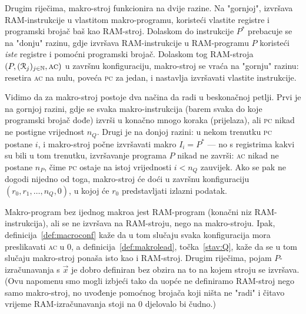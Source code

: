 Drugim riječima, makro-stroj funkcionira na dvije razine. Na "gornjoj", izvršava RAM-instrukcije u vlastitom makro-programu, koristeći vlastite registre i programski brojač baš kao RAM-stroj. Dolaskom do instrukcije $P^*$ prebacuje se na "donju" razinu, gdje izvršava RAM-instrukcije u RAM-programu $P$ koristeći \emph{iste} registre i pomoćni programski brojač. Dolaskom tog RAM-stroja $(P,(\mathcal R_{j})_{j\in{\mathbb N}},\textsc{ac})$ u završnu konfiguraciju, makro-stroj se vraća na "gornju" razinu: resetira \textsc{ac} na nulu, poveća \textsc{pc} za jedan, i nastavlja izvršavati vlastite instrukcije.

Vidimo da za makro-stroj postoje dva načina da radi u beskonačnoj petlji. Prvi je na gornjoj razini, gdje se svaka makro-instrukcija (barem svaka do koje programski brojač dođe) izvrši u konačno mnogo koraka (prijelaza), ali \textsc{pc} nikad ne postigne vrijednost $n_Q$. Drugi je na donjoj razini: u nekom trenutku \textsc{pc} postane $i$, i makro-stroj počne izvršavati makro $I_i=P^*$ --- no s registrima kakvi su bili u tom trenutku, izvršavanje programa $P$ nikad ne završi: \textsc{ac} nikad ne postane $n_P$, čime \textsc{pc} ostaje na istoj vrijednosti $i<n_Q$ zauvijek. Ako se pak ne dogodi nijedno od toga, makro-stroj će doći u završnu konfiguraciju $(r_0,r_1,\dotsc,n_Q,0)$, u kojoj će $r_0$ predstavljati izlazni podatak.

\begin{napomena}[{name=[svaki RAM-program je makro-program]}]\label{nap:rem}
Makro-program bez ijednog makroa jest RAM-program (konačni niz RAM-instrukcija), ali se ne izvršava na RAM-stroju, nego na makro-stroju. Ipak, definicija~\ref{def:macroconf} kaže da u tom slučaju svaka konfiguracija mora preslikavati \textsc{ac} u $0$, a definicija~\ref{def:makrolead}, točka~\ref{stav:Q}, kaže da se u tom slučaju makro-stroj ponaša isto kao i RAM-stroj. Drugim riječima, pojam $P$-izračunavanja s $\vec x$ je dobro definiran bez obzira na to na kojem stroju se izvršava. (Ovu napomenu smo mogli izbjeći tako da uopće ne definiramo RAM-stroj nego samo makro-stroj, no uvođenje pomoćnog brojača koji ništa ne "radi" i čitavo vrijeme RAM-izračunavanja stoji na $0$ djelovalo bi čudno.)
\end{napomena}


